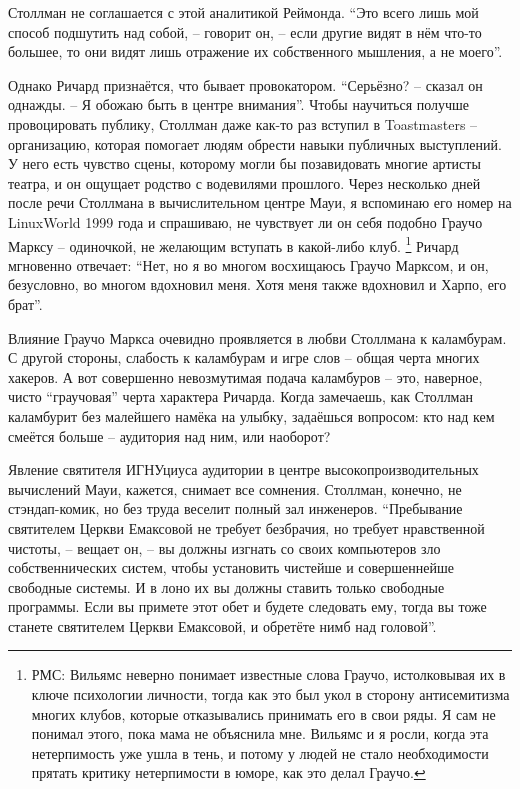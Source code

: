 Столлман не соглашается с этой аналитикой Реймонда. \enquote{Это всего лишь мой способ подшутить над собой, -- говорит он, -- если другие видят в нём что-то большее, то они видят лишь отражение их собственного мышления, а не моего}.

Однако Ричард признаётся, что бывает провокатором. \enquote{Серьёзно? -- сказал он однажды. -- Я обожаю быть в центре внимания}. Чтобы научиться получше провоцировать публику, Столлман даже как-то раз вступил в Toastmasters -- организацию, которая помогает людям обрести навыки публичных выступлений. У него есть чувство сцены, которому могли бы позавидовать многие артисты театра, и он ощущает родство с водевилями прошлого. Через несколько дней после речи Столлмана в вычислительном центре Мауи, я вспоминаю его номер на LinuxWorld 1999 года и спрашиваю, не чувствует ли он себя подобно Граучо Марксу -- одиночкой, не желающим вступать в какой-либо клуб. \footnote{РМС: Вильямс неверно понимает известные слова Граучо, истолковывая их в ключе психологии личности, тогда как это был укол в сторону антисемитизма многих клубов, которые отказывались принимать его в свои ряды. Я сам не понимал этого, пока мама не объяснила мне. Вильямс и я росли, когда эта нетерпимость уже ушла в тень, и потому у людей не стало необходимости прятать критику нетерпимости в юморе, как это делал Граучо.} Ричард мгновенно отвечает: \enquote{Нет, но я во многом восхищаюсь Граучо Марксом, и он, безусловно, во многом вдохновил меня. Хотя меня также вдохновил и Харпо, его брат}.

Влияние Граучо Маркса очевидно проявляется в любви Столлмана к каламбурам. С другой стороны, слабость к каламбурам и игре слов -- общая черта многих хакеров. А вот совершенно невозмутимая подача каламбуров -- это, наверное, чисто \enquote{граучовая} черта характера Ричарда. Когда замечаешь, как Столлман каламбурит без малейшего намёка на улыбку, задаёшься вопросом: кто над кем смеётся больше -- аудитория над ним, или наоборот?

Явление святителя ИГНУциуса аудитории в центре высокопроизводительных вычислений Мауи, кажется, снимает все сомнения. Столлман, конечно, не стэндап-комик, но без труда веселит полный зал инженеров. \enquote{Пребывание святителем Церкви Емаксовой не требует безбрачия, но требует нравственной чистоты, -- вещает он, -- вы должны изгнать со своих компьютеров зло собственнических систем, чтобы установить чистейше и совершеннейше свободные системы. И в лоно их вы должны ставить только свободные программы. Если вы примете этот обет и будете следовать ему, тогда вы тоже станете святителем Церкви Емаксовой, и обретёте нимб над головой}.

